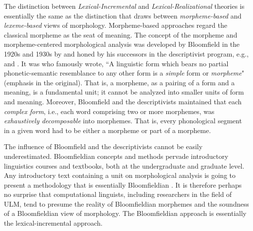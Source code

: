 The distinction between \emph{Lexical-Incremental} 
and \emph{Lexical-Realizational} 
theories is essentially the same as the distinction 
that \cite{aronoff:1994} draws
between \emph{morpheme-based} and \emph{lexeme-based} 
views of morphology. Morpheme-based approaches regard 
the classical morpheme as the seat of meaning.
The concept of the morpheme and morpheme-centered morphological analysis
was developed by Bloomfield in the 1920s and 1930s by
\citet{bloomfield:1926, bloomfield:1933} and honed by his 
successors in the descriptivist program, e.g., 
\cite{hockett:1947} and \cite{harris:1955}.
It was \cite[][p. 161]{bloomfield:1933} who famously wrote, ``A linguistic form 
which bears no partial phonetic-semantic resemblance to any other form is a \emph{simple} form or \emph{morpheme}" (emphasis in the original). 
That is, a morpheme, as a pairing of a form and a meaning, is a fundamental unit; it cannot be analyzed into smaller units
of form and meaning.
Moreover, Bloomfield and the descriptivists maintained that
each \emph{complex form}, i.e., each word comprising 
two or more morphemes, was \emph{exhaustively decomposable} 
into morphemes. That is, every phonological segment
in a given word had to be either a morpheme or part of a morpheme. 

The influence of Bloomfield and the descriptivists
cannot be easily underestimated. Bloomfieldian concepts and methods 
pervade introductory linguistics courses and textbooks, both at
the undergraduate and graduate level. Any introductory text containing 
a unit on morphological analysis is going to present a methodology that 
is essentially Bloomfieldian \citep{anderson:2017}.
It is therefore perhaps no surprise that
computational linguists, including researchers in the field of \ac{ULM}, 
tend to presume
the reality of Bloomfieldian morphemes and the soundness of a 
Bloomfieldian view of morphology. The Bloomfieldian approach is essentially
the lexical-incremental approach.

